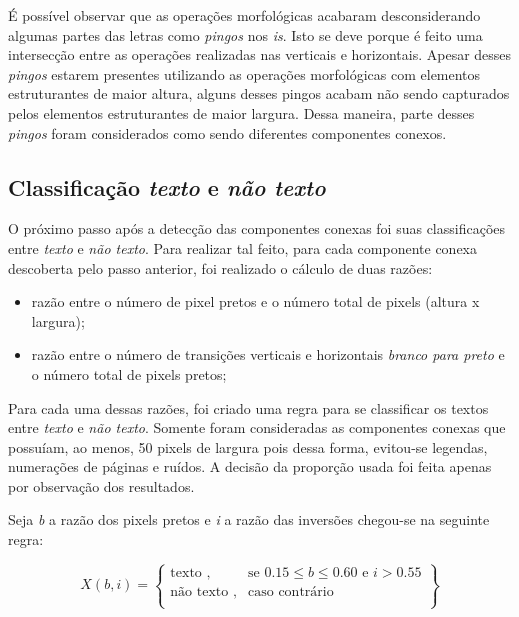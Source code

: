 \documentclass{article}
\begin{document}
É possível observar que as operações morfológicas acabaram desconsiderando algumas partes das letras como \textit{pingos} nos \textit{is}. Isto se deve porque é feito uma intersecção entre as operações realizadas nas verticais e horizontais. Apesar desses \textit{pingos} estarem presentes utilizando as operações morfológicas com elementos estruturantes de maior altura, alguns desses pingos acabam não sendo capturados pelos elementos estruturantes de maior largura. Dessa maneira, parte desses \textit{pingos} foram considerados como sendo diferentes componentes conexos.

\subsection{Classificação \textit{texto} e \textit{não texto}}

O próximo passo após a detecção das componentes conexas foi suas classificações entre \textit{texto} e \textit{não texto}. Para realizar tal feito, para cada componente conexa descoberta pelo passo anterior, foi realizado o cálculo de duas razões:

\begin{itemize}
  \item razão entre o número de pixel pretos e o número total de pixels (altura x largura);

  \item razão entre o número de transições verticais e horizontais \textit{branco para preto} e o número total de pixels pretos;
\end{itemize}

Para cada uma dessas razões, foi criado uma regra para se classificar os textos entre \textit{texto} e \textit{não texto}. Somente foram consideradas as componentes conexas que possuíam, ao menos, 50 pixels de largura pois dessa forma, evitou-se legendas, numerações de páginas e ruídos. A decisão da proporção usada foi feita apenas por observação dos resultados. 

Seja \textit{b} a razão dos pixels pretos e \textit{i} a razão das inversões chegou-se na seguinte regra:

\[
  X(b,i) = \left\{\begin{array}{lr}
      \text{texto }, &      \text{se } 0.15\leq b\leq 0.60 \text{ e } i > 0.55\\
      \text{não texto }, &  \text{caso contrário }\\
      \end{array}\right\}
\]
\end{document}
